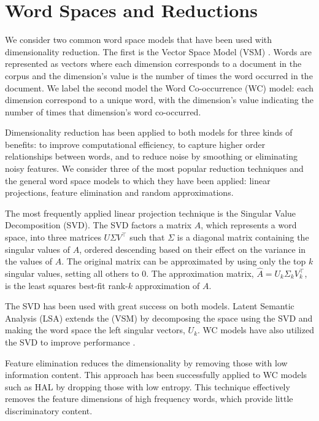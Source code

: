 \documentclass[11pt]{article}
\begin{document}
\section{Word Spaces and Reductions}
\label{sec:dim}

We consider two common word space models that have been used with dimensionality
reduction.  The first is the Vector Space Model (VSM) \cite{salton75vector}.
Words are represented as vectors where each dimension corresponds to a document
in the corpus and the dimension's value is the number of times the word occurred
in the document.  We label the second model the Word Co-occurrence (WC) model:
each dimension correspond to a unique word, with the dimension's value
indicating the number of times that dimension's word co-occurred.

Dimensionality reduction has been applied to both models for three kinds of
benefits: to improve computational efficiency, to capture higher order
relationships between words, and to reduce noise by smoothing or eliminating
noisy features.  We consider three of the most popular reduction techniques and
the general word space models to which they have been applied: linear
projections, feature elimination and random approximations.

The most frequently applied linear projection technique is the Singular Value
Decomposition (SVD).  The SVD factors a matrix $A$, which represents a word
space, into three matrices $U \Sigma V^\top$ such that $\Sigma$ is a diagonal
matrix containing the singular values of $A$, ordered descending based on their
effect on the variance in the values of $A$.  The original matrix can be
approximated by using only the top $k$ singular values, setting all others to 0.
The approximation matrix, $\hat{A} = U_k \Sigma_k V_k^{\top}$, is the least
squares best-fit rank-$k$ approximation of $A$.

The SVD has been used with great success on both models.  Latent Semantic
Analysis (LSA) \cite{landauer97solution} extends the (VSM) by decomposing the
space using the SVD and making the word space the left singular vectors, $U_k$.
WC models have also utilized the SVD to improve performance %
\cite{schutze92dimensions,bullinaria07extracting,baroni08concepts}.

Feature elimination reduces the dimensionality by removing those with low
information content.  This approach has been successfully applied to WC models
such as HAL \cite{lund96producing} by dropping those with low entropy.  This
technique effectively removes the feature dimensions of high frequency words,
which provide little discriminatory content.
\end{document}
